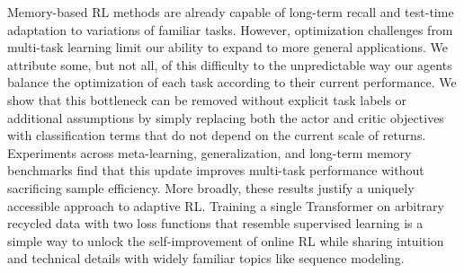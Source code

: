 \vspace{-2mm}
Memory-based RL methods are already capable of long-term recall and test-time adaptation to variations of familiar tasks. However, optimization challenges from multi-task learning limit our ability to expand to more general applications. We attribute some, but not all, of this difficulty to the unpredictable way our agents balance the optimization of each task according to their current performance. We show that this bottleneck can be removed without explicit task labels or additional assumptions by simply replacing both the actor and critic objectives with classification terms that do not depend on the current scale of returns. Experiments across meta-learning, generalization, and long-term memory benchmarks find that this update improves multi-task performance without sacrificing sample efficiency. More broadly, these results justify a uniquely accessible approach to adaptive RL. Training a single Transformer on arbitrary recycled data with two loss functions that resemble supervised learning is a simple way to unlock the self-improvement of online RL while sharing intuition and technical details with widely familiar topics like sequence modeling.